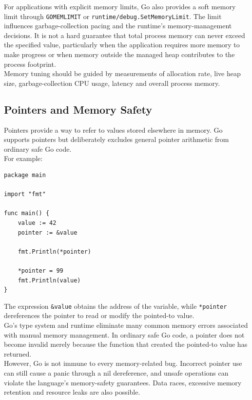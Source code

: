 For applications with explicit memory limits, Go also provides a soft memory limit through \texttt{GOMEMLIMIT} or \texttt{runtime/debug.SetMemoryLimit}. The limit influences garbage-collection pacing and the runtime's memory-management decisions. It is not a hard guarantee that total process memory can never exceed the specified value, particularly when the application requires more memory to make progress or when memory outside the managed heap contributes to the process footprint.\\

Memory tuning should be guided by measurements of allocation rate, live heap size, garbage-collection CPU usage, latency and overall process memory.

\subsection{Pointers and Memory Safety}

Pointers provide a way to refer to values stored elsewhere in memory. Go supports pointers but deliberately excludes general pointer arithmetic from ordinary safe Go code.\\

For example:

\begin{lstlisting}
package main

import "fmt"

func main() {
    value := 42
    pointer := &value

    fmt.Println(*pointer)

    *pointer = 99
    fmt.Println(value)
}
\end{lstlisting}

The expression \texttt{\&value} obtains the address of the variable, while \texttt{*pointer} dereferences the pointer to read or modify the pointed-to value.\\

Go's type system and runtime eliminate many common memory errors associated with manual memory management. In ordinary safe Go code, a pointer does not become invalid merely because the function that created the pointed-to value has returned.\\

However, Go is not immune to every memory-related bug. Incorrect pointer use can still cause a panic through a nil dereference, and unsafe operations can violate the language's memory-safety guarantees. Data races, excessive memory retention and resource leaks are also possible.\\

